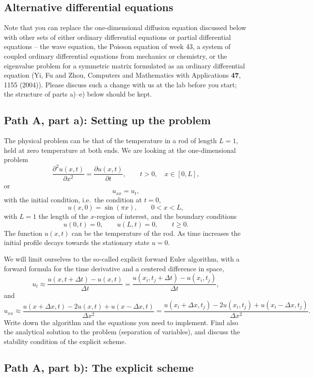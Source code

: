 \documentclass[11pt,a4paper]{article}
\begin{document}
\subsection*{Alternative differential equations}

Note that you can replace the one-dimensional diffusion equation discussed
below with other sets of either ordinary differential equations or partial
differential equations -- the wave equation, the Poisson equation of week 43,
a system of coupled ordinary differential equations from mechanics or
chemistry, or the eigenvalue problem for a symmetric matrix formulated as an
ordinary differential equation (Yi, Fu and Zhou, Computers and Mathematics
with Applications \textbf{47}, 1155 (2004)).  Please discuss such a change
with us at the lab before you start; the structure of parts a)--e) below
should be kept.

\subsection*{Path A, part a): Setting up the problem}

The physical problem can be that of the temperature in a rod of length
$L=1$, held at zero temperature at both ends.  We are looking at the
one-dimensional problem
\[
  \frac{\partial^2 u(x,t)}{\partial x^2} = \frac{\partial u(x,t)}{\partial t},
  \qquad t>0,\quad x\in[0,L],
\]
or
\[
  u_{xx} = u_t ,
\]
with the initial condition, i.e.\ the condition at $t=0$,
\[
  u(x,0) = \sin(\pi x), \qquad 0<x<L,
\]
with $L=1$ the length of the $x$-region of interest, and the boundary
conditions
\[
  u(0,t) = 0, \qquad u(L,t) = 0, \qquad t\ge 0 .
\]
The function $u(x,t)$ can be the temperature of the rod.  As time increases
the initial profile decays towards the stationary state $u=0$.

We will limit ourselves to the so-called explicit forward Euler algorithm,
with a forward formula for the time derivative and a centered difference in
space,
\[
  u_t \approx \frac{u(x,t+\Delta t)-u(x,t)}{\Delta t}
      = \frac{u(x_i,t_j+\Delta t)-u(x_i,t_j)}{\Delta t},
\]
and
\[
  u_{xx} \approx \frac{u(x+\Delta x,t)-2u(x,t)+u(x-\Delta x,t)}{\Delta x^2}
       = \frac{u(x_i+\Delta x,t_j)-2u(x_i,t_j)+u(x_i-\Delta x,t_j)}{\Delta x^2}.
\]
Write down the algorithm and the equations you need to implement.  Find
also the analytical solution to the problem (separation of variables), and
discuss the stability condition of the explicit scheme.

\subsection*{Path A, part b): The explicit scheme}
\end{document}
